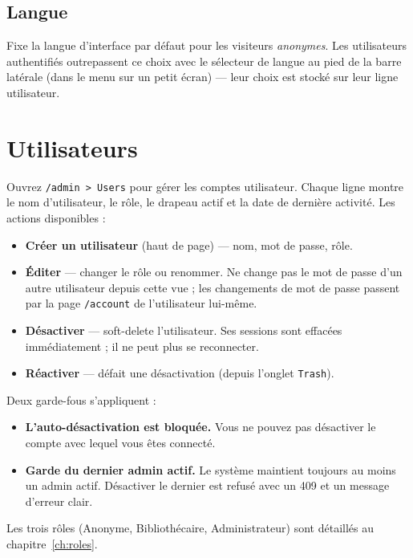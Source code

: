 \subsection*{Langue}

Fixe la langue d'interface par défaut pour les visiteurs
\emph{anonymes}. Les utilisateurs authentifiés outrepassent ce
choix avec le sélecteur de langue au pied de la barre latérale
(dans le menu sur un petit écran) — leur choix est stocké sur leur ligne utilisateur.

\section{Utilisateurs}\label{sec:users}

Ouvrez \texttt{/admin > Users} pour gérer les comptes utilisateur.
Chaque ligne montre le nom d'utilisateur, le rôle, le drapeau
actif et la date de dernière activité. Les actions disponibles :

\begin{itemize}
  \item \textbf{Créer un utilisateur} (haut de page) — nom, mot de
        passe, rôle.
  \item \textbf{Éditer} — changer le rôle ou renommer. Ne change
        pas le mot de passe d'un autre utilisateur depuis cette
        vue ; les changements de mot de passe passent par la page
        \texttt{/account} de l'utilisateur lui-même.
  \item \textbf{Désactiver} — soft-delete l'utilisateur. Ses
        sessions sont effacées immédiatement ; il ne peut plus se
        reconnecter.
  \item \textbf{Réactiver} — défait une désactivation (depuis
        l'onglet \texttt{Trash}).
\end{itemize}

Deux garde-fous s'appliquent :

\begin{itemize}
  \item \textbf{L'auto-désactivation est bloquée.} Vous ne pouvez
        pas désactiver le compte avec lequel vous êtes connecté.
  \item \textbf{Garde du dernier admin actif.} Le système maintient
        toujours au moins un admin actif. Désactiver le dernier
        est refusé avec un 409 et un message d'erreur clair.
\end{itemize}

Les trois rôles (Anonyme, Bibliothécaire, Administrateur)
sont détaillés au chapitre~\ref{ch:roles}.
